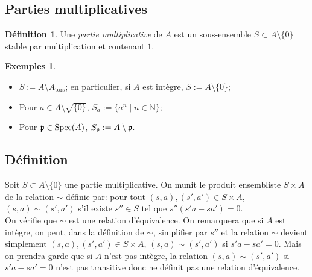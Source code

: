 \documentclass[a4paper, oneside, 12pt]{book}
\theoremstyle{theoremeStyle} %
\theoremstyle{definition} %
\newtheorem{definition}[theoreme]{Définition}
\newtheorem{exemples}[theoreme]{Exemples}
\DeclareMathOperator{\Spec}{Spec}
\newcommand{\N}{\mathbb{N}}
\begin{document}
\subsection{Parties multiplicatives}

\begin{definition}
	Une \textit{partie multiplicative} de $A$ est un sous-ensemble $S\subset A\setminus\lbrace 0\rbrace$ stable par multiplication et contenant $1$.
\end{definition}




\begin{exemples}
	\begin{itemize}
		\item $S:=A\setminus A_{\mathrm{tors}}$; en particulier, si $A$ est intègre, $S:=A\setminus\lbrace 0\rbrace$;
		\item Pour $a\in A\setminus \sqrt{\lbrace 0\rbrace}$, $S_a:=\lbrace a^n\;|\; n\in\N\rbrace$;
		\item Pour $\frak{p}\in \Spec(A)$, $S_{\frak{p}}:=A\setminus \frak{p}$.
	\end{itemize}
\end{exemples}

\subsection{Définition}
	\label{LocDef} Soit $S\subset A\setminus\lbrace 0\rbrace$ une partie multiplicative. On munit le produit ensembliste $S\times A$ de la relation $\sim $ définie par: pour tout $(s,a),(s',a')\in S\times A$, $(s,a)\sim (s',a')$ s'il existe $s''\in S$ tel que $s''(s'a-sa')=0$. \\

 On vérifie que $\sim$ est une relation d'équivalence. On remarquera que si $A$ est intègre, on peut, dans la définition de $\sim$, simplifier par $s''$ et la relation $\sim$ devient simplement $(s,a),(s',a')\in S\times A$, $(s,a)\sim (s',a')$ si $s'a-sa'=0$.  Mais on prendra garde que si $A$ n'est pas intègre,  la relation $(s,a)\sim (s',a')$ si $s'a-sa'=0$ n'est pas transitive donc ne définit pas une relation d'équivalence.\\
\end{document}
